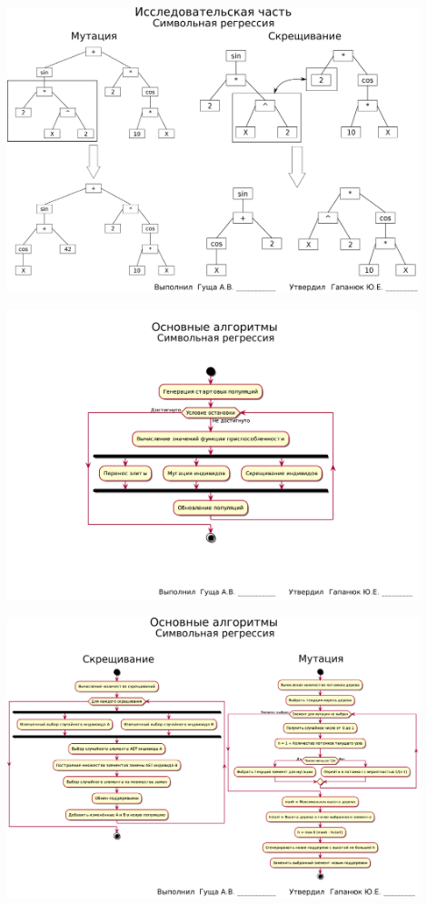 \documentclass[russian,utf8, a1paper, emptystyle]{eskdgraph}
\begin{document}
\begin{ESKDdrawing}
\includegraphics[width=0.90\textwidth]{lists/list10_1_2}
\end{ESKDdrawing}

\begin{ESKDdrawing}
\includegraphics[width=0.90\textwidth]{lists/list11_1}
\end{ESKDdrawing}

\begin{ESKDdrawing}
\centering
\includegraphics[width=0.90\textwidth]{lists/list11}
\end{ESKDdrawing}
\end{document}
